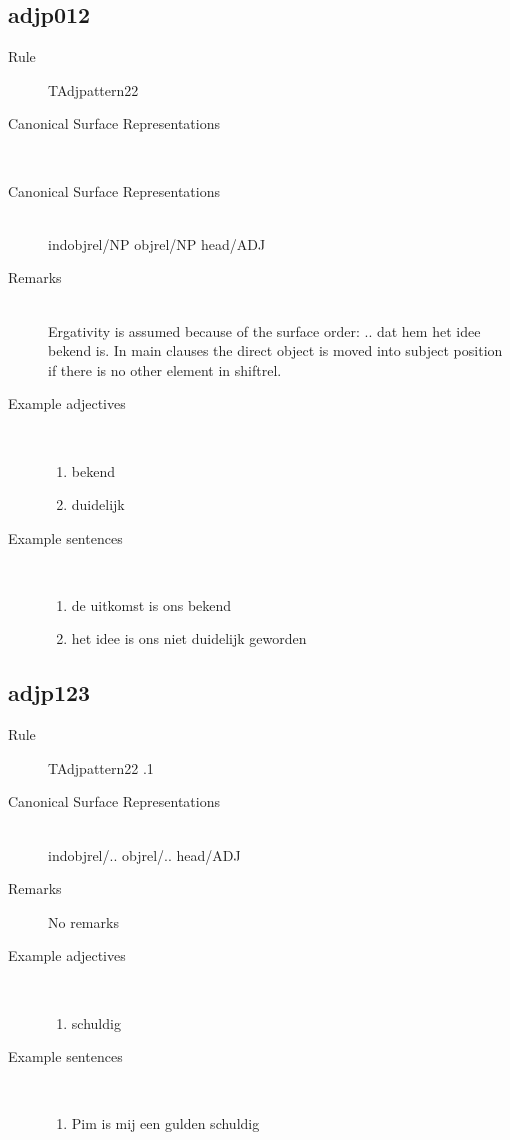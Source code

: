   \subsection{adjp012}
\begin{description}
  \item [Rule] TAdjpattern22
  \item [Canonical Surface Representations]  \mbox{}\\ 
  \item [Canonical Surface Representations]  \mbox{}\\ 
indobjrel/NP objrel/NP head/ADJ
  \item [Remarks]  \mbox{}\\ 
Ergativity is assumed because of the surface order:
..  dat hem het idee bekend is.
 In main clauses the direct object is moved into subject position if 
there is no other element in shiftrel. 
  \item [Example adjectives]\mbox{}\\
\begin{enumerate}
  \item bekend
  \item duidelijk
\end{enumerate}
  \item [Example sentences]\mbox{}\\
\begin{enumerate}
  \item de uitkomst is ons bekend
  \item het idee  is ons niet duidelijk geworden
\end{enumerate}
\end{description}
  \subsection{adjp123}
\begin{description}
  \item [Rule] TAdjpattern22 .1
  \item [Canonical Surface Representations]  \mbox{}\\ 
indobjrel/.. objrel/.. head/ADJ
  \item [Remarks] No remarks

  \item [Example adjectives]\mbox{}\\
\begin{enumerate}
  \item schuldig
\end{enumerate}
  \item [Example sentences]\mbox{}\\
\begin{enumerate}
  \item Pim is mij een gulden schuldig
\end{enumerate}
\end{description}
\newpage
